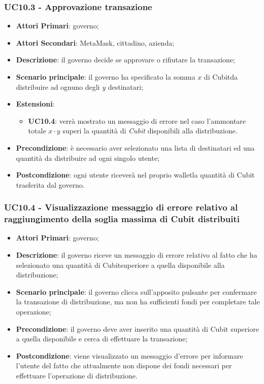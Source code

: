 \subsubsection{UC10.3 - Approvazione transazione}
\begin{itemize}
	\item \textbf{Attori Primari}: governo;
	\item \textbf{Attori Secondari}: MetaMask\glo, cittadino, azienda\glo;
	\item \textbf{Descrizione}: il governo decide se approvare o rifiutare la transazione;
	\item \textbf{Scenario principale}: il governo ha specificato la somma 
	$x$ di Cubit\glosp da distribuire ad ognuno degli $y$ destinatari;
	\item \textbf{Estensioni}:
	\begin{itemize}
		\item \textbf{UC10.4}: verrà mostrato un messaggio di errore nel caso 
		l'ammontare totale $x\cdot y$ superi la quantità di \textit{Cubit} disponibili 
		alla distribuzione.
	\end{itemize}
	\item \textbf{Precondizione}: è necessario aver selezionato una lista di destinatari ed una quantità da distribuire ad ogni singolo utente;
	\item \textbf{Postcondizione}: ogni utente riceverà nel proprio wallet\glosp la quantità di Cubit trasferita dal governo.
\end{itemize}
\subsubsection{UC10.4 - Visualizzazione messaggio di errore relativo al raggiungimento della soglia massima di Cubit distribuiti}
\begin{itemize}
	\item \textbf{Attori Primari}: governo;
	\item \textbf{Descrizione}: il governo riceve un messaggio di errore relativo al fatto che ha selezionato una quantità di Cubit\glosp superiore a quella disponibile alla distribuzione;
	\item \textbf{Scenario principale}: il governo clicca sull'apposito pulsante per confermare la transazione di distribuzione, ma non ha sufficienti fondi per completare tale operazione;
	\item \textbf{Precondizione}: il governo deve aver inserito una quantità di Cubit superiore a quella disponibile e cerca di effettuare la transazione;
	\item \textbf{Postcondizione}: viene visualizzato un messaggio d'errore per informare l'utente del fatto che attualmente non dispone dei fondi necessari per effettuare l'operazione di distribuzione.
	
\end{itemize} 
